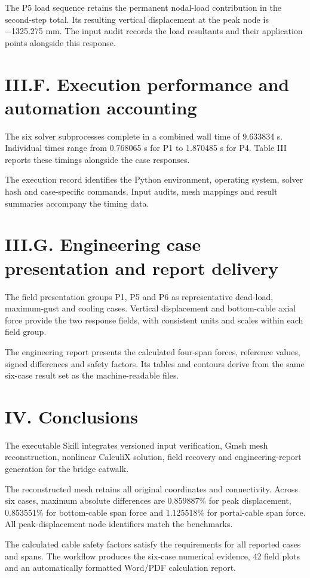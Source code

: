 \documentclass[11pt]{article}
\begin{document}
The P5 load sequence retains the permanent nodal-load contribution in the second-step total. Its resulting vertical displacement at the peak node is −1325.275 mm. The input audit records the load resultants and their application points alongside this response.

\section*{III.F. Execution performance and automation accounting}
The six solver subprocesses complete in a combined wall time of 9.633834 s. Individual times range from 0.768065 s for P1 to 1.870485 s for P4. Table III reports these timings alongside the case responses.

The execution record identifies the Python environment, operating system, solver hash and case-specific commands. Input audits, mesh mappings and result summaries accompany the timing data.

\section*{III.G. Engineering case presentation and report delivery}
The field presentation groups P1, P5 and P6 as representative dead-load, maximum-gust and cooling cases. Vertical displacement and bottom-cable axial force provide the two response fields, with consistent units and scales within each field group.

The engineering report presents the calculated four-span forces, reference values, signed differences and safety factors. Its tables and contours derive from the same six-case result set as the machine-readable files.

\section*{IV. Conclusions}
The executable Skill integrates versioned input verification, Gmsh mesh reconstruction, nonlinear CalculiX solution, field recovery and engineering-report generation for the bridge catwalk.

The reconstructed mesh retains all original coordinates and connectivity. Across six cases, maximum absolute differences are 0.859887\% for peak displacement, 0.853551\% for bottom-cable span force and 1.125518\% for portal-cable span force. All peak-displacement node identifiers match the benchmarks.

The calculated cable safety factors satisfy the requirements for all reported cases and spans. The workflow produces the six-case numerical evidence, 42 field plots and an automatically formatted Word/PDF calculation report.
\end{document}
